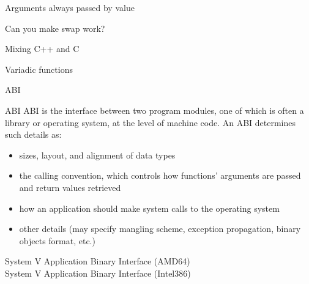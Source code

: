 \begin{frame}{Arguments always passed by value}
    \begin{block}{Can you make swap work?}
        
    \end{block}
\end{frame}
\begin{frame}{Mixing C++ and C}
\end{frame}
\begin{frame}{Variadic functions}
    
\end{frame}
\begin{frame}{ABI}
    \begin{block}{ABI}
        ABI is the interface between two program modules, one of which is often a library or operating system, at the level of machine code.
        An ABI determines such details as:
        \begin{itemize}
            \item sizes, layout, and alignment of data types
            \item the calling convention, which controls how functions' arguments are passed and return values retrieved
            \item how an application should make system calls to the operating system
            \item other details (may specify mangling scheme, exception propagation, binary objects format, etc.)
        \end{itemize}
    \end{block}
    System V Application Binary Interface (AMD64)    \href{http://www.x86-64.org/documentation/abi.pdf}{} \\
    System V Application Binary Interface (Intel386) \href{http://math-atlas.sourceforge.net/devel/assembly/abi386-4.pdf}{}
\end{frame}
